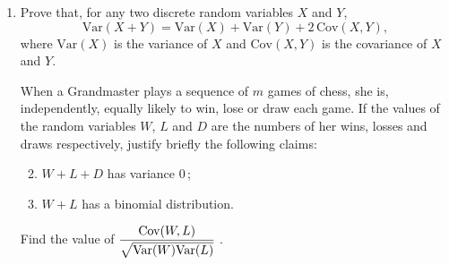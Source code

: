 \documentclass[a4, 11pt]{report}
\newlength{\qspace}
\newcounter{qnumber}
\newenvironment{question}%
 {\vspace{\qspace}
  \begin{enumerate}[\bfseries 1\quad][10]%
    \setcounter{enumi}{\value{qnumber}}%
    \item%
 }
{
  \end{enumerate}
  \filbreak
  \stepcounter{qnumber}
 }
\newenvironment{questionparts}[1][1]%
 {
  \begin{enumerate}[\bfseries (i)]%
    \setcounter{enumii}{#1}
    \addtocounter{enumii}{-1}
    \setlength{\itemsep}{5mm}
    \setlength{\parskip}{8pt}
 }
 {
  \end{enumerate}
 }
\begin{document}
\begin{question}
Prove that, for any two discrete random variables $X$ and $Y$,
\[
\mathrm{Var} \left(X + Y \right) 
= \mathrm{Var}(X) + \mathrm{Var}(Y) +
2 \, \mathrm{Cov}(X,Y),
\]
where $\mathrm{Var}(X)$ 
is the variance of $X$ and $\mathrm{Cov}(X,Y)$  is 
the covariance of $X$ and $Y$.

When a Grandmaster plays a sequence of 
$m$ games of chess, she is, independently,
 equally likely to win, lose or draw each game. 
If the values of the random variables $W$, $L$ and $D$ are 
the numbers of her wins, losses and draws respectively, justify briefly
the following claims:
\begin{questionparts}
\item$W + L + D$ has variance $0\,$;
\item $W + L$ has a  binomial distribution.
\end{questionparts}
Find the value of 
$\displaystyle {\mathrm{Cov}(W,L) \over \sqrt{\mathrm{Var}(W) \mathrm{Var}(L)}}\;$.
\end{question}
	
\end{document}
